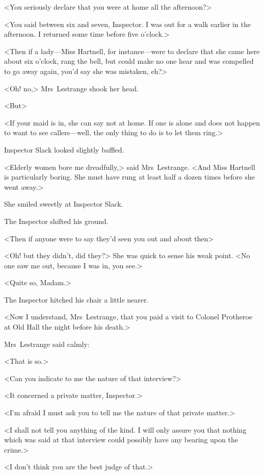 <You seriously declare that you were at home all the afternoon?>

<You said between six and seven, Inspector. I was out for a walk earlier in the afternoon. I returned some time before five o'clock.>

<Then if a lady—Miss Hartnell, for instance—were to declare that she came here about six o'clock, rang the bell, but could make no one hear and was compelled to go away again, you'd say she was mistaken, eh?>

<Oh! no,> Mrs~Lestrange shook her head.

<But\longdash>

<If your maid is in, she can say not at home. If one is alone and does not happen to want to see callers—well, the only thing to do is to let them ring.>

Inspector Slack looked slightly baffled.

<Elderly women bore me dreadfully,> said Mrs~Lestrange. <And Miss Hartnell is particularly boring. She must have rung at least half a dozen times before she went away.>

She smiled sweetly at Inspector Slack.

The Inspector shifted his ground.

<Then if anyone were to say they'd seen you out and about then\longdash>

<Oh! but they didn't, did they?> She was quick to sense his weak point. <No one saw me out, because I was in, you see.>

<Quite so, Madam.>

The Inspector hitched his chair a little nearer.

<Now I understand, Mrs~Lestrange, that you paid a visit to Colonel Protheroe at Old Hall the night before his death.>

Mrs~Lestrange said calmly:

<That is so.>

<Can you indicate to me the nature of that interview?>

<It concerned a private matter, Inspector.>

<I'm afraid I must ask you to tell me the nature of that private matter.>

<I shall not tell you anything of the kind. I will only assure you that nothing which was said at that interview could possibly have any bearing upon the crime.>

<I don't think you are the best judge of that.>

